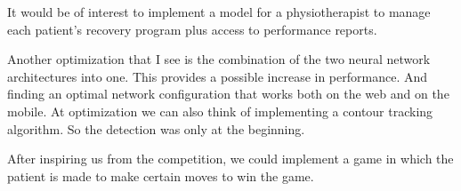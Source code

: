 It would be of interest to implement a model for a physiotherapist to manage each patient's recovery program plus access to performance reports.

Another optimization that I see is the combination of the two neural network architectures into one.
This provides a possible increase in performance. And finding an optimal network configuration that works both on the web and on the mobile.
At optimization we can also think of implementing a contour tracking algorithm. So the detection was only at the beginning.

After inspiring us from the competition, we could implement a game in which the patient is made to make certain moves to win the game.

